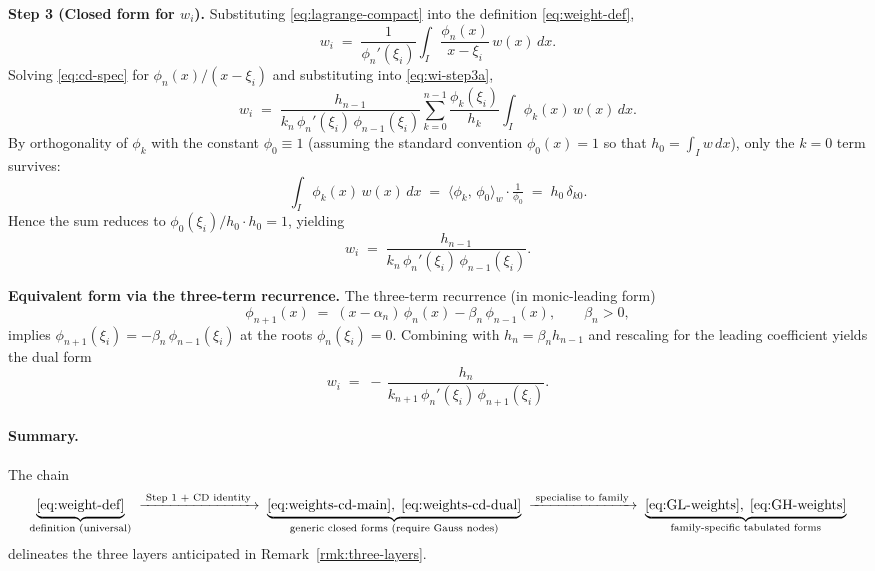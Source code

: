 \documentclass[11pt,a4paper]{article}
\theoremstyle{definition}
\newcommand{\ipw}[2]{\langle #1,\, #2 \rangle_{w}}
\begin{document}
\textbf{Step 3 (Closed form for $w_i$).}
Substituting \eqref{eq:lagrange-compact} into the definition
\eqref{eq:weight-def},
\begin{equation}
  w_i \;=\; \frac{1}{\phi_n'(\xi_i)}\int_I \frac{\phi_n(x)}{x-\xi_i}\,w(x)\,dx.
  \label{eq:wi-step3a}
\end{equation}
Solving \eqref{eq:cd-spec} for $\phi_n(x)/(x-\xi_i)$ and substituting into
\eqref{eq:wi-step3a},
\[
  w_i \;=\; \frac{h_{n-1}}{k_n\,\phi_n'(\xi_i)\,\phi_{n-1}(\xi_i)}
            \sum_{k=0}^{n-1}\frac{\phi_k(\xi_i)}{h_k}
            \int_I \phi_k(x)\,w(x)\,dx.
\]
By orthogonality of $\phi_k$ with the constant $\phi_0\equiv 1$ (assuming the
standard convention $\phi_0(x)=1$ so that $h_0=\int_I w\,dx$), only the $k=0$
term survives:
\[
  \int_I \phi_k(x)\,w(x)\,dx \;=\; \ipw{\phi_k}{\phi_0}\cdot \tfrac{1}{\phi_0}
                              \;=\; h_0\,\delta_{k0}.
\]
Hence the sum reduces to $\phi_0(\xi_i)/h_0 \cdot h_0 = 1$, yielding
\begin{equation}
  \boxed{\;
    w_i \;=\; \frac{h_{n-1}}{k_n\,\phi_n'(\xi_i)\,\phi_{n-1}(\xi_i)}.
  \;}
  \label{eq:weights-cd-main}
\end{equation}

\textbf{Equivalent form via the three-term recurrence.}
The three-term recurrence (in monic-leading form)
\[
  \phi_{n+1}(x) \;=\; (x-\alpha_n)\,\phi_n(x)
                       - \beta_n\,\phi_{n-1}(x), \qquad \beta_n>0,
\]
implies $\phi_{n+1}(\xi_i)=-\beta_n\,\phi_{n-1}(\xi_i)$ at the roots
$\phi_n(\xi_i)=0$. Combining with $h_n=\beta_n h_{n-1}$
\cite[Eq.~(3.2.7)]{Szego1975} and rescaling for the leading coefficient
yields the dual form
\begin{equation}
  w_i \;=\; -\,\frac{h_n}{k_{n+1}\,\phi_n'(\xi_i)\,\phi_{n+1}(\xi_i)}.
  \label{eq:weights-cd-dual}
\end{equation}

\paragraph{Summary.}
The chain
\[
  \underbrace{\eqref{eq:weight-def}}_{\text{definition (universal)}}
  \;\xrightarrow{\;\text{Step 1 + CD identity}\;}\;
  \underbrace{\eqref{eq:weights-cd-main},\;\eqref{eq:weights-cd-dual}}_{\text{generic closed forms (require Gauss nodes)}}
  \;\xrightarrow{\;\text{specialise to family}\;}\;
  \underbrace{\eqref{eq:GL-weights},\;\eqref{eq:GH-weights}}_{\text{family-specific tabulated forms}}
\]
delineates the three layers anticipated in Remark~\ref{rmk:three-layers}.
\end{document}
